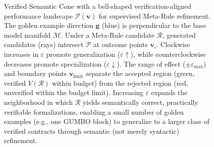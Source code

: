 \documentclass[conference]{IEEEtran}
\begin{document}
\begin{figure}[h]
\centering

\caption{
Verified Semantic Cone with a bell-shaped verification-aligned performance landscape $\mathcal{P}(\mathbf{v})$ for supervised Meta-Rule refinement. The golden example direction $\mathbf{g}$ (blue) is perpendicular to the base model manifold $\mathcal{M}$. Under a Meta-Rule candidate $\mathcal{R}$, generated candidates (rays) intersect $\mathcal{P}$ at outcome points $\mathbf{v}_i$. Clockwise increases in $\varepsilon$ promote generalization ($\varepsilon\uparrow$), while counterclockwise decreases promote specialization ($\varepsilon\downarrow$). The range of effect ($\pm\varepsilon_{\max}$) and boundary points $\mathbf{v}_{\text{limit}}$ separate the accepted region (green, verified $V(\mathcal{R})$ within budget) from the rejected region (red, unverified within the budget limit). Increasing $\varepsilon$ expands the neighborhood in which $\mathcal{R}$ yields semantically correct, practically verifiable formalizations, enabling a small number of golden examples (e.g., one GUMBO block) to generalize to a larger class of verified contracts through semantic (not merely syntactic) refinement.
}
\label{fig:vsc}
\end{figure}
\end{document}
